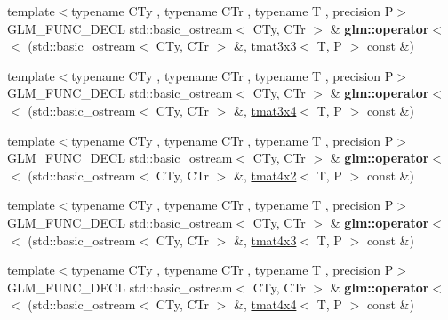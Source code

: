 \begin{DoxyCompactItemize}
\item 
\mbox{\label{group__gtx__io_ga3ea3ca90bea2e763079f09af1e5d50ab}} 
{\footnotesize template$<$typename C\+Ty , typename C\+Tr , typename T , precision P$>$ }\\G\+L\+M\+\_\+\+F\+U\+N\+C\+\_\+\+D\+E\+CL std\+::basic\+\_\+ostream$<$ C\+Ty, C\+Tr $>$ \& {\bfseries glm\+::operator$<$$<$} (std\+::basic\+\_\+ostream$<$ C\+Ty, C\+Tr $>$ \&, \hyperlink{structglm_1_1tmat3x3}{tmat3x3}$<$ T, P $>$ const \&)
\item 
\mbox{\label{group__gtx__io_ga5a5ca6f99c027a2277b24de487198fe0}} 
{\footnotesize template$<$typename C\+Ty , typename C\+Tr , typename T , precision P$>$ }\\G\+L\+M\+\_\+\+F\+U\+N\+C\+\_\+\+D\+E\+CL std\+::basic\+\_\+ostream$<$ C\+Ty, C\+Tr $>$ \& {\bfseries glm\+::operator$<$$<$} (std\+::basic\+\_\+ostream$<$ C\+Ty, C\+Tr $>$ \&, \hyperlink{structglm_1_1tmat3x4}{tmat3x4}$<$ T, P $>$ const \&)
\item 
\mbox{\label{group__gtx__io_ga8ce3cf61260e62080a9596c2f10ab4a0}} 
{\footnotesize template$<$typename C\+Ty , typename C\+Tr , typename T , precision P$>$ }\\G\+L\+M\+\_\+\+F\+U\+N\+C\+\_\+\+D\+E\+CL std\+::basic\+\_\+ostream$<$ C\+Ty, C\+Tr $>$ \& {\bfseries glm\+::operator$<$$<$} (std\+::basic\+\_\+ostream$<$ C\+Ty, C\+Tr $>$ \&, \hyperlink{structglm_1_1tmat4x2}{tmat4x2}$<$ T, P $>$ const \&)
\item 
\mbox{\label{group__gtx__io_gaca75b14a0534a02860349a114a10aa44}} 
{\footnotesize template$<$typename C\+Ty , typename C\+Tr , typename T , precision P$>$ }\\G\+L\+M\+\_\+\+F\+U\+N\+C\+\_\+\+D\+E\+CL std\+::basic\+\_\+ostream$<$ C\+Ty, C\+Tr $>$ \& {\bfseries glm\+::operator$<$$<$} (std\+::basic\+\_\+ostream$<$ C\+Ty, C\+Tr $>$ \&, \hyperlink{structglm_1_1tmat4x3}{tmat4x3}$<$ T, P $>$ const \&)
\item 
\mbox{\label{group__gtx__io_ga6683acc91ba7ce5822e25a2517550bff}} 
{\footnotesize template$<$typename C\+Ty , typename C\+Tr , typename T , precision P$>$ }\\G\+L\+M\+\_\+\+F\+U\+N\+C\+\_\+\+D\+E\+CL std\+::basic\+\_\+ostream$<$ C\+Ty, C\+Tr $>$ \& {\bfseries glm\+::operator$<$$<$} (std\+::basic\+\_\+ostream$<$ C\+Ty, C\+Tr $>$ \&, \hyperlink{structglm_1_1tmat4x4}{tmat4x4}$<$ T, P $>$ const \&)

\end{DoxyCompactItemize}

